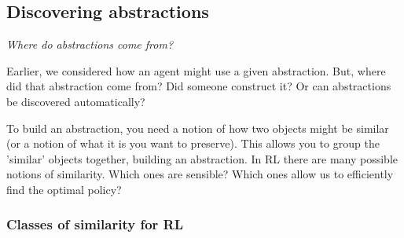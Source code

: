 %
%
%
%



\subsection{Discovering abstractions}

\begin{displayquote}
  \textsl{Where do abstractions come from?}
\end{displayquote}

Earlier, we considered how an agent might use a given abstraction.
But, where did that abstraction come from? Did someone construct it?
Or can abstractions be discovered automatically?

To build an abstraction, you need a notion of how two objects might be
similar (or a notion of what it is you want to preserve).
This allows you to group the 'similar' objects together, building an abstraction.
In RL there are many possible notions of similarity. Which ones are sensible?
Which ones allow us to efficiently find the optimal policy?

\vspace{5mm}

\subsubsection{Classes of similarity for RL}\label{similar-classes}

